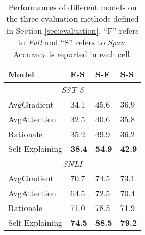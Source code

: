 \documentclass[11pt,a4paper]{article}
\begin{document}
\begin{table}[t]
  \centering
  \small
  \begin{tabular}{llll}
    \toprule
    {\bf Model} & {\bf F-S} & {\bf S-F} & {\bf S-S}\\
    \hline\hline 
    \multicolumn{4}{c}{\textit{SST-5}}\\
    \midrule
    AvgGradient & 34.1 & 45.6 & 36.9 \\ 
    AvgAttention & 32.5 & 40.6 & 35.8 \\
    Rationale \citep{lei2016rationalizing} & 35.2 & 49.9 & 36.2\\
    Self-Explaining & {\bf 38.4} & {\bf 54.9} & {\bf 42.9} \\
    \hline\hline 
    \multicolumn{4}{c}{\textit{SNLI}}\\
    \midrule
    AvgGradient & 70.7 & 74.5 & 73.1 \\ 
    AvgAttention & 64.5 & 72.5 & 70.4 \\
    Rationale \citep{lei2016rationalizing} & 71.0 & 78.5 & 71.9\\
    Self-Explaining & {\bf 74.5} & {\bf 88.5} & {\bf 79.2} \\
    \bottomrule
  \end{tabular}
  \caption{Performances of different models on the three evaluation methods defined in Section \ref{sec:evaluation}. ``F'' refers to {\it Full} and ``S'' refers to {\it Span}. Accuracy is reported in each cell.}
  \label{tab:evaluation}
\end{table}
\end{document}
